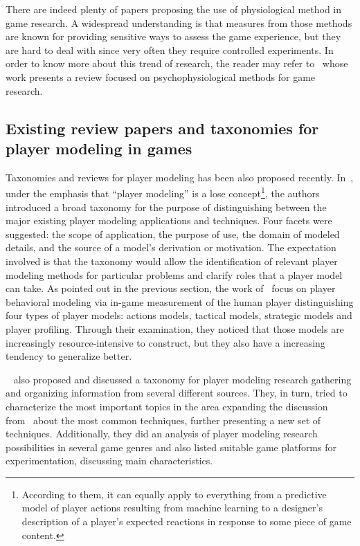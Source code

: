 There are indeed plenty of papers proposing the use of physiological method in game research. A widespread understanding is that measures from those methods are known for providing sensitive ways to assess the game experience, but they are hard to deal with since very often they require controlled experiments. In order to know more about this trend of research, the reader may refer to~\cite{kivikangas_review_2011} whose work presents a review focused on psychophysiological methods for game research.   
 
\subsection{Existing review papers and taxonomies for player modeling in games}\label{reviews}
Taxonomies and reviews for player modeling has been also proposed recently. In~\cite{smith_inclusive_2011}, under the emphasis that ``player modeling'' is a lose concept\footnote{According to them, it can equally apply to everything from a predictive model of player actions resulting from machine learning to a designer's description of a player's expected reactions in response to some piece of game content.}, the authors introduced a broad taxonomy for the purpose of distinguishing between the major existing player modeling applications and techniques. Four facets were suggested: the scope of application, the purpose of use, the domain of modeled details, and the source of a model's derivation or motivation. The expectation involved is that the taxonomy would allow the identification of relevant player modeling methods for particular problems and clarify roles that a player model can take. As pointed out in the previous section, the work of~\cite{bakkes_player_2012} focus on player behavioral modeling via in-game measurement of the human player distinguishing four types of player models: actions models, tactical models, strategic models and player profiling. Through their examination, they noticed that those models are increasingly resource-intensive to construct, but they also have a increasing tendency to generalize better.

~\cite{machado_player_2011} also proposed and discussed a taxonomy for player modeling research gathering and organizing information from several different sources. They, in turn, tried to characterize the most important topics in the area expanding the discussion from~\cite{herik_opponent_2005} about the most common techniques, further presenting a new set of techniques. Additionally, they did an analysis of player modeling research possibilities in several game genres and also listed suitable game platforms for experimentation, discussing main characteristics.

